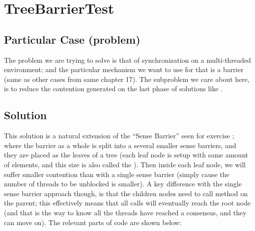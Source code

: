 \section{\textbf{TreeBarrierTest}}

\subsection{Particular Case (problem)}
The problem we are trying to solve is that of synchronization on a
multi-threaded environment; and the particular mechanism we want to
use for that is a barrier (same as other cases from same chapter
17). The subproblem we care about here, is to reduce the contention
generated on the last phase of solutions like .

\subsection{Solution}
This solution is a natural extension of the ``Sense Barrier'' seen for
exercise ; where the barrier as a whole is split
into a several smaller sense barriers, and they are placed as the
leaves of a tree (each leaf node is setup with same amount of
elements, and this size is also called the ). Then inside
each leaf node, we will suffer smaller 
contention than with a single sense barrier (simply cause the number
of threads to be unblocked is smaller). A key difference with the single
sense barrier approach though, is that the children nodes need to call
 method on the parent; this effectively means that all calls
will eventually reach the root node (and that is the way to know all
the threads have reached a consensus, and they can move on). The
relevant parts of code are shown below: \\

